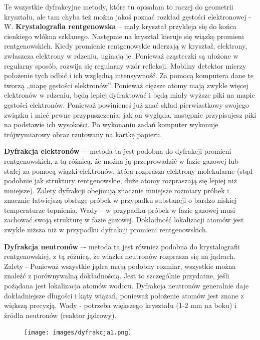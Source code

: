 \documentclass{article}
\begin{document}
Te wszystkie dyfrakcyjne metody, które tu opisałam to raczej do geometrii kryształu, ale tam chyba też można jakoś poznać rozkład gęstości elektronowej - W.
\textbf{Krystalografia rentgenowska} -- mały kryształ przykleja się do końca cienkiego włókna szklanego. Następnie na kryształ kieruje się wiązkę promieni rentgenowskich. Kiedy promienie rentgenowskie uderzają w kryształ, elektrony, zwłaszcza elektrony w rdzeniu, uginają je. Ponieważ cząsteczki są ułożone w regularny sposób, rozwija się regularny wzór refleksji. Mobilny detektor mierzy położenie tych odbić i ich względną intensywność. Za pomocą komputera dane te tworzą „mapę gęstości elektronów”. Ponieważ cięższe atomy mają zwykle więcej elektronów w rdzeniu, będą lepiej dyfraktować i będą miały wyższe piki na mapie gęstości elektronów. Ponieważ powinieneś już znać skład pierwiastkowy swojego związku i mieć pewne przypuszczenia, jak on wygląda, następnie przypisujesz piki na podstawie ich wysokości. Po wykonaniu zadań komputer wykonuje trójwymiarowy obraz rzutowany na kartkę papieru.

\textbf{Dyfrakcja elektronów} –- metoda ta jest podobna do dyfrakcji promieni rentgenowskich, z tą różnicą, że można ją przeprowadzić w fazie gazowej lub stałej za pomocą wiązki elektronów, która rozprasza elektrony molekularne (stąd podobnie jak struktury rentgenowskie, duże atomy rozpraszają się lepiej niż mniejsze). Zalety dyfrakcji obejmują znacznie mniejsze rozmiary próbek i znacznie łatwiejszą obsługę próbek w przypadku substancji o bardzo niskiej temperaturze topnienia. Wady – w przypadku próbek w fazie gazowej musi zachować swoją strukturę w fazie gazowej. Dokładność lokalizacji atomów jest zwykle niższa niż w przypadku dyfrakcji promieni rentgenowskich.

\textbf{Dyfrakcja neutronów} –- metoda ta jest również podobna do krystalografii rentgenowskiej, z tą różnicą, że wiązka neutronów rozprasza się na jądrach. Zalety - Ponieważ wszystkie jądra mają podobny rozmiar, wszystkie można znaleźć z porównywalną dokładnością. Jest to szczególnie przydatne, jeśli pożądana jest lokalizacja atomów wodoru. Dyfrakcja neutronów generalnie daje dokładniejsze długości i kąty wiązań, ponieważ położenie atomów jest znane z większą precyzją. Wady - potrzeba większego kryształu (1-2 mm na boku) i źródła neutronów (reaktor jądrowy).

\begin{figure}[H]
    \centering
    \texttt{[image: images/dyfrakcja1.png]}
\end{figure}
\end{document}
